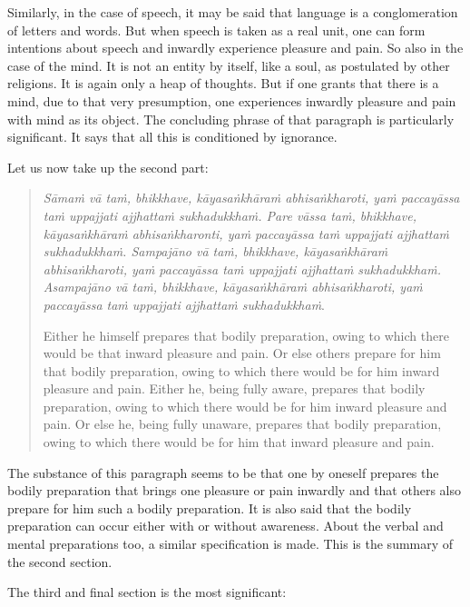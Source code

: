 Similarly, in the case of speech, it may be said that language is a conglomeration of letters and words. But when speech is taken as a real unit, one can form intentions about speech and inwardly experience pleasure and pain. So also in the case of the mind. It is not an entity by itself, like a soul, as postulated by other religions. It is again only a heap of thoughts. But if one grants that there is a mind, due to that very presumption, one experiences inwardly pleasure and pain with mind as its object. The concluding phrase of that paragraph is particularly significant. It says that all this is conditioned by ignorance.

Let us now take up the second part:

\begin{quote}
\emph{Sāmaṁ vā taṁ, bhikkhave, kāyasaṅkhāraṁ abhisaṅkharoti, yaṁ paccayāssa taṁ uppajjati ajjhattaṁ sukhadukkhaṁ. Pare vāssa taṁ, bhikkhave, kāyasaṅkhāraṁ abhisaṅkharonti, yaṁ paccayāssa taṁ uppajjati ajjhattaṁ sukhadukkhaṁ. Sampajāno vā taṁ, bhikkhave, kāyasaṅkhāraṁ abhisaṅkharoti, yaṁ paccayāssa taṁ uppajjati ajjhattaṁ sukhadukkhaṁ. Asampajāno vā taṁ, bhikkhave, kāyasaṅkhāraṁ abhisaṅkharoti, yaṁ paccayāssa taṁ uppajjati ajjhattaṁ sukhadukkhaṁ}.

Either he himself prepares that bodily preparation, owing to which there would be that inward pleasure and pain. Or else others prepare for him that bodily preparation, owing to which there would be for him inward pleasure and pain. Either he, being fully aware, prepares that bodily preparation, owing to which there would be for him inward pleasure and pain. Or else he, being fully unaware, prepares that bodily preparation, owing to which there would be for him that inward pleasure and pain.
\end{quote}

The substance of this paragraph seems to be that one by oneself prepares the bodily preparation that brings one pleasure or pain inwardly and that others also prepare for him such a bodily preparation. It is also said that the bodily preparation can occur either with or without awareness. About the verbal and mental preparations too, a similar specification is made. This is the summary of the second section.

The third and final section is the most significant:

